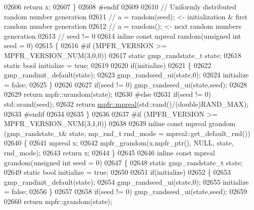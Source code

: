 \begin{DoxyCode}
{{02606     \textcolor{keywordflow}{return} x;
02607 \}
02608 \textcolor{preprocessor}{#endif}
02609 
02610 \textcolor{comment}{// Uniformly distributed random number generation}
02611 \textcolor{comment}{// a = random(seed); <- initialization & first random number generation}
02612 \textcolor{comment}{// a = random();     <- next random numbers generation}
02613 \textcolor{comment}{// seed != 0}
02614 \textcolor{keyword}{inline} \textcolor{keyword}{const} mpreal random(\textcolor{keywordtype}{unsigned} \textcolor{keywordtype}{int} seed = 0)
02615 \{
02616 \textcolor{preprocessor}{#if (MPFR\_VERSION >= MPFR\_VERSION\_NUM(3,0,0))}
02617     \textcolor{keyword}{static} gmp\_randstate\_t state;
02618     \textcolor{keyword}{static} \textcolor{keywordtype}{bool} initialize = \textcolor{keyword}{true};
02619 
02620     \textcolor{keywordflow}{if}(initialize)
02621     \{
02622         gmp\_randinit\_default(state);
02623         gmp\_randseed\_ui(state,0);
02624         initialize = \textcolor{keyword}{false};
02625     \}
02626 
02627     \textcolor{keywordflow}{if}(seed != 0)    gmp\_randseed\_ui(state,seed);
02628 
02629     \textcolor{keywordflow}{return} mpfr::urandom(state);
02630 \textcolor{preprocessor}{#else}
02631     \textcolor{keywordflow}{if}(seed != 0)    std::srand(seed);
02632     \textcolor{keywordflow}{return} \hyperlink{classmpfr_1_1mpreal}{mpfr::mpreal}(std::rand()/(\textcolor{keywordtype}{double})RAND\_MAX);
02633 \textcolor{preprocessor}{#endif}
02634 
02635 \}
02636 
02637 \textcolor{preprocessor}{#if (MPFR\_VERSION >= MPFR\_VERSION\_NUM(3,1,0))}
02638 
02639 \textcolor{keyword}{inline} \textcolor{keyword}{const} mpreal grandom (gmp\_randstate\_t& state, mp\_rnd\_t rnd\_mode = mpreal::get\_default\_rnd())
02640 \{
02641     mpreal x;
02642     mpfr\_grandom(x.mpfr\_ptr(), NULL, state, rnd\_mode);
02643     \textcolor{keywordflow}{return} x;
02644 \}
02645 
02646 \textcolor{keyword}{inline} \textcolor{keyword}{const} mpreal grandom(\textcolor{keywordtype}{unsigned} \textcolor{keywordtype}{int} seed = 0)
02647 \{
02648     \textcolor{keyword}{static} gmp\_randstate\_t state;
02649     \textcolor{keyword}{static} \textcolor{keywordtype}{bool} initialize = \textcolor{keyword}{true};
02650 
02651     \textcolor{keywordflow}{if}(initialize)
02652     \{
02653         gmp\_randinit\_default(state);
02654         gmp\_randseed\_ui(state,0);
02655         initialize = \textcolor{keyword}{false};
02656     \}
02657 
02658     \textcolor{keywordflow}{if}(seed != 0) gmp\_randseed\_ui(state,seed);
02659 
02660     \textcolor{keywordflow}{return} mpfr::grandom(state);
}}
\end{DoxyCode}
